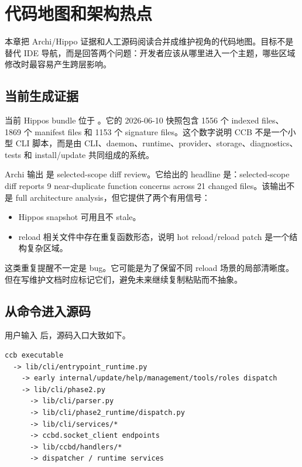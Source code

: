 \chapter{代码地图和架构热点}

本章把 Archi/Hippo 证据和人工源码阅读合并成维护视角的代码地图。目标不是替代 IDE 导航，而是回答两个问题：开发者应该从哪里进入一个主题，哪些区域修改时最容易产生跨层影响。

\section{当前生成证据}

当前 Hippos bundle 位于 。它的 2026-06-10 快照包含 1556 个 indexed files、1869 个 manifest files 和 1153 个 signature files。这个数字说明 CCB 不是一个小型 CLI 脚本，而是由 CLI、daemon、runtime、provider、storage、diagnostics、tests 和 install/update 共同组成的系统。

Archi 输出  是 selected-scope diff review。它给出的 headline 是：selected-scope diff reports 9 near-duplicate function concerns across 21 changed files。该输出不是 full architecture analysis，但它提供了两个有用信号：

\begin{itemize}
  \item Hippos snapshot 可用且不 stale。
  \item reload 相关文件中存在重复函数形态，说明 hot reload/reload patch 是一个结构复杂区域。
\end{itemize}

这类重复提醒不一定是 bug。它可能是为了保留不同 reload 场景的局部清晰度。但在写维护文档时应标记它们，避免未来继续复制粘贴而不抽象。

\section{从命令进入源码}

用户输入  后，源码入口大致如下。

\begin{Verbatim}[fontsize=\small,frame=single]
ccb executable
  -> lib/cli/entrypoint_runtime.py
    -> early internal/update/help/management/tools/roles dispatch
    -> lib/cli/phase2.py
      -> lib/cli/parser.py
      -> lib/cli/phase2_runtime/dispatch.py
      -> lib/cli/services/*
      -> ccbd.socket_client endpoints
      -> lib/ccbd/handlers/*
      -> dispatcher / runtime services
\end{Verbatim}

